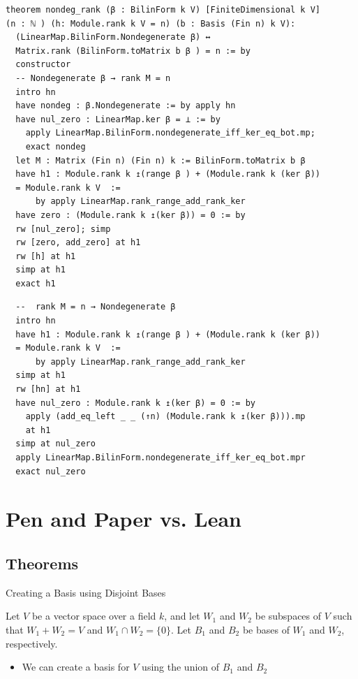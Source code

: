 \documentclass[svgnames]{beamer}
\begin{document}
{\scriptsize
\begin{verbatim}
theorem nondeg_rank (β : BilinForm k V) [FiniteDimensional k V] 
(n : ℕ ) (h: Module.rank k V = n) (b : Basis (Fin n) k V): 
  (LinearMap.BilinForm.Nondegenerate β) ↔ 
  Matrix.rank (BilinForm.toMatrix b β ) = n := by
  constructor
  -- Nondegenerate β → rank M = n
  intro hn
  have nondeg : β.Nondegenerate := by apply hn
  have nul_zero : LinearMap.ker β = ⊥ := by
    apply LinearMap.BilinForm.nondegenerate_iff_ker_eq_bot.mp; 
    exact nondeg
  let M : Matrix (Fin n) (Fin n) k := BilinForm.toMatrix b β
  have h1 : Module.rank k ↥(range β ) + (Module.rank k (ker β)) 
  = Module.rank k V  :=
      by apply LinearMap.rank_range_add_rank_ker
  have zero : (Module.rank k ↥(ker β)) = 0 := by 
  rw [nul_zero]; simp
  rw [zero, add_zero] at h1
  rw [h] at h1
  simp at h1
  exact h1
  \end{verbatim}
  
  \begin{verbatim}
  --  rank M = n → Nondegenerate β
  intro hn
  have h1 : Module.rank k ↥(range β ) + (Module.rank k (ker β)) 
  = Module.rank k V  :=
      by apply LinearMap.rank_range_add_rank_ker
  simp at h1
  rw [hn] at h1
  have nul_zero : Module.rank k ↥(ker β) = 0 := by
    apply (add_eq_left _ _ (↑n) (Module.rank k ↥(ker β))).mp
    at h1
  simp at nul_zero
  apply LinearMap.BilinForm.nondegenerate_iff_ker_eq_bot.mpr
  exact nul_zero
\end{verbatim}
}

\section{Pen and Paper vs. Lean}
\label{sec:"proof-comparison"}

\subsection{Theorems}

\begin{frame}[label={sec:proof_comparison}]{Creating a Basis using Disjoint Bases}
\begin{Theorem}
Let $V$ be a vector space over a field $k$, and let $W_1$ and $W_2$ be subspaces of $V$ such that $W_1 + W_2 = V$ and $W_1 \cap W_2 = \{0\}$. Let $B_1$ and $B_2$ be bases of $W_1$ and $W_2$, respectively. 
\begin{itemize}
    \item We can create a basis for $V$ using the union of $B_1$ and $B_2$
\end{itemize}
\end{Theorem}


\end{frame}
\end{document}
